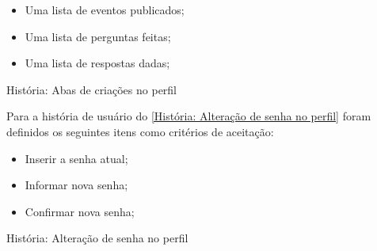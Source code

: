 \begin{itemize}
\item Uma lista de eventos publicados;
\item Uma lista de perguntas feitas;
\item Uma lista de respostas dadas;
\end{itemize}

\def\arraystretch{2}
\begin{quadro}[htb]
\centering
\ABNTEXfontereduzida
\caption[História: Abas de criações no perfil]{História: Abas de criações no perfil}
\label{História: Abas de criações no perfil}
\end{quadro}
\FloatBarrier

Para a história de usuário do \autoref{História: Alteração de senha no perfil} foram definidos os seguintes itens como critérios de aceitação:

\begin{itemize}
\item Inserir a senha atual;
\item Informar nova senha;
\item Confirmar nova senha;
\end{itemize}

\def\arraystretch{2}
\begin{quadro}[htb]
\centering
\ABNTEXfontereduzida
\caption[História: Alteração de senha no perfil]{História: Alteração de senha no perfil}
\label{História: Alteração de senha no perfil}
\end{quadro}
\FloatBarrier 

